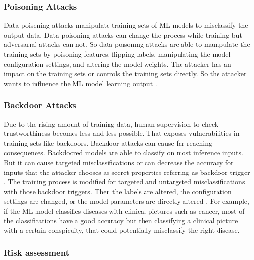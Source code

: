 \subsubsection*{Poisoning Attacks}

Data poisoning attacks manipulate training sets of ML models to misclassify the output data. Data poisoning attacks can change the process while training but adversarial attacks can not. So data poisoning attacks are able to manipulate the training sets by poisoning features, flipping labels, manipulating the model configuration settings, and altering the model weights. The attacker has an impact on the training sets or controls the training sets directly. So the attacker wants to influence the ML model learning output \cite{DBLP:journals/corr/abs-2112-02797}.

\subsubsection*{Backdoor Attacks}
\label{sec:backdoor}

Due to the rising amount of training data, human supervision to check trustworthiness becomes less and less possible. That exposes vulnerabilities in training sets like backdoors. Backdoor attacks
can cause far reaching consequences. Backdoored models are able to classify on most inference inputs. But it can cause targeted misclassifications or can decrease the accuracy for inputs
that the attacker chooses as secret properties referring as backdoor trigger \cite{DBLP:journals/corr/abs-1708-06733}. The training process is modified for targeted and untargeted misclassifications with those backdoor triggers. Then the labels are altered, the configuration settings are changed, or the model parameters are directly altered \cite{DBLP:journals/corr/abs-2112-02797}. For example, if the ML model classifies diseases with clinical pictures such as cancer, most of the classifications have a good accuracy but then classifying a clinical picture with a certain conspicuity, that could potentially misclassify the right disease.

\subsubsection*{Risk assessment}

